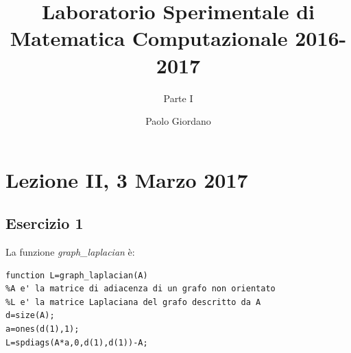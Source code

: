 \documentclass[11pt,a4paper,twoside,openright,titlepage,
                           headinclude,footinclude,BCOR5mm,
                           numbers=noenddot,cleardoublepage=empty,
                           tablecaptionabove]{scrbook}
\begin{document}

\frontmatter

\title{Laboratorio Sperimentale di Matematica Computazionale 2016-2017}
\subtitle{Parte I}
\author{Paolo Giordano}
\maketitle


\tableofcontents

\mainmatter

\chapter{Lezione II, 3 Marzo 2017}
\section{Esercizio 1}
La funzione \emph{graph\_laplacian} è:
\begin{lstlisting}[frame=trBL]
function L=graph_laplacian(A)
%A e' la matrice di adiacenza di un grafo non orientato
%L e' la matrice Laplaciana del grafo descritto da A
d=size(A);
a=ones(d(1),1);
L=spdiags(A*a,0,d(1),d(1))-A;
\end{lstlisting}
\end{document}
